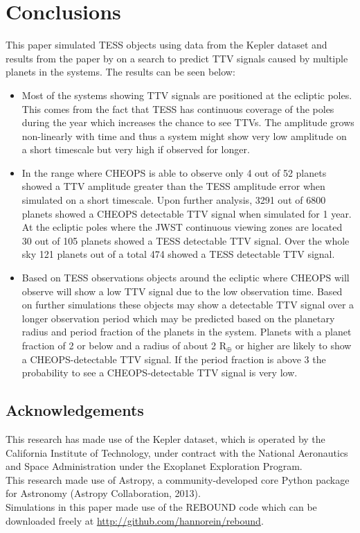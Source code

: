 \documentclass[12pt]{report}
\begin{document}
	
	
\chapter{Conclusions}
	This paper simulated TESS objects using data from the Kepler dataset and results from the paper by \cite{2015ApJ...809...77S} on a search to predict TTV signals caused by multiple planets in the systems. The results can be seen below:
	\begin{itemize}
		\item Most of the systems showing TTV signals are positioned at the ecliptic poles. This comes from the fact that TESS has continuous coverage of the poles during the year which increases the chance to see TTVs. The amplitude grows non-linearly with time and thus a system might show very low amplitude on a short timescale but very high if observed for longer.
		\item In the range where CHEOPS is able to observe only 4 out of 52 planets showed a TTV amplitude greater than the TESS amplitude error when simulated on a short timescale. Upon further analysis, 3291 out of 6800 planets showed a CHEOPS detectable TTV signal when simulated for 1 year. At the ecliptic poles where the JWST continuous viewing zones are located 30 out of 105 planets showed a TESS detectable TTV signal. Over the whole sky 121 planets out of a total 474 showed a TESS detectable TTV signal.
		\item Based on TESS observations objects around the ecliptic where CHEOPS will observe will show a low TTV signal due to the low observation time. Based on further simulations these objects may show a detectable TTV signal over a longer observation period which may be predicted based on the planetary radius and period fraction of the planets in the system. Planets with a planet fraction of 2 or below and a radius of about 2 R$_{\oplus}$ or higher are likely to show a CHEOPS-detectable TTV signal. If the period fraction is above 3 the probability to see a CHEOPS-detectable TTV signal is very low.
	\end{itemize}

\section*{Acknowledgements}
This research has made use of the Kepler dataset, which is operated by the California Institute of Technology, under contract with the National Aeronautics and Space Administration under the Exoplanet Exploration Program. \vspace{0.5cm}\\
This research made use of Astropy, a community-developed core Python package for Astronomy (Astropy Collaboration, 2013).\vspace{0.5cm}\\
Simulations in this paper made use of the REBOUND code which can be downloaded freely at \url{http://github.com/hannorein/rebound}.
\end{document}
